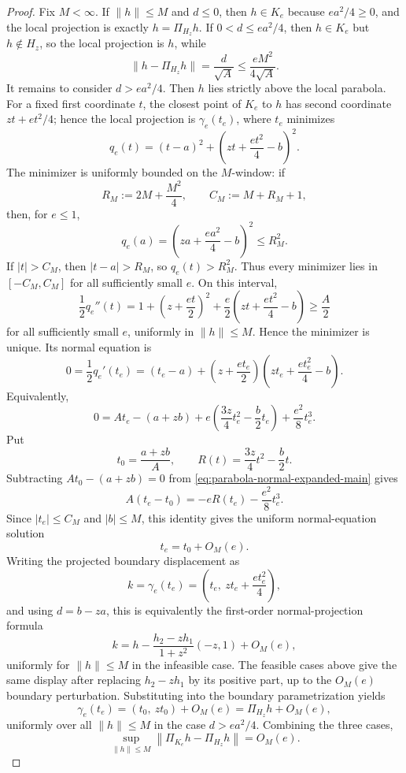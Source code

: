 \begin{proof}
Fix \(M<\infty\).  If \(\|h\|\le M\) and \(d\le0\), then \(h\in K_e\) because
\(e a^2/4\ge0\), and the local projection is exactly \(h=\Pi_{H_z}h\).  If
\(0<d\le e a^2/4\), then \(h\in K_e\) but \(h\notin H_z\), so the local
projection is \(h\), while
\[
\|h-\Pi_{H_z}h\|=\frac{d}{\sqrt A}\le \frac{eM^2}{4\sqrt A}.
\]
It remains to consider \(d>e a^2/4\).  Then \(h\) lies strictly above the
local parabola.  For a fixed first coordinate \(t\), the closest point of
\(K_e\) to \(h\) has second coordinate \(zt+et^2/4\); hence the local
projection is \(\gamma_e(t_e)\), where \(t_e\) minimizes
\[
q_e(t)=(t-a)^2+\left(zt+\frac{e t^2}{4}-b\right)^2 .
\]
The minimizer is uniformly bounded on the \(M\)-window: if
\[
R_M:=2M+\frac{M^2}{4},\qquad C_M:=M+R_M+1,
\]
then, for \(e\le1\),
\[
q_e(a)=\left(za+\frac{e a^2}{4}-b\right)^2\le R_M^2 .
\]
If \(|t|>C_M\), then \(|t-a|>R_M\), so \(q_e(t)>R_M^2\).  Thus every
minimizer lies in \([-C_M,C_M]\) for all sufficiently small \(e\).  On this
interval,
\[
\frac12q_e''(t)
=1+\left(z+\frac{et}{2}\right)^2
+\frac e2\left(zt+\frac{e t^2}{4}-b\right)
\ge \frac A2
\]
for all sufficiently small \(e\), uniformly in \(\|h\|\le M\).  Hence the
minimizer is unique.  Its normal equation is
\begin{equation}\label{eq:parabola-normal-equation-main}
0=\frac12q_e'(t_e)
=(t_e-a)+\left(z+\frac{e t_e}{2}\right)
\left(zt_e+\frac{e t_e^2}{4}-b\right).
\end{equation}
Equivalently,
\begin{equation}\label{eq:parabola-normal-expanded-main}
0=A t_e-(a+zb)
+e\left(\frac{3z}{4}t_e^2-\frac b2t_e\right)
+\frac{e^2}{8}t_e^3 .
\end{equation}
Put
\[
t_0=\frac{a+zb}{A},\qquad
R(t)=\frac{3z}{4}t^2-\frac b2t .
\]
Subtracting \(A t_0-(a+zb)=0\) from
\eqref{eq:parabola-normal-expanded-main} gives
\[
A(t_e-t_0)=-eR(t_e)-\frac{e^2}{8}t_e^3 .
\]
Since \(|t_e|\le C_M\) and \(|b|\le M\), this identity gives the uniform
normal-equation solution
\[
t_e=t_0+O_M(e).
\]
Writing the projected boundary displacement as
\[
k=\gamma_e(t_e)
=\left(t_e,\ zt_e+\frac{e t_e^2}{4}\right),
\]
and using \(d=b-za\), this is equivalently the first-order normal-projection
formula
\[
k
=h-\frac{h_2-zh_1}{1+z^2}(-z,1)+O_M(e),
\]
uniformly for \(\|h\|\le M\) in the infeasible case.  The feasible cases above
give the same display after replacing \(h_2-zh_1\) by its positive part, up to
the \(O_M(e)\) boundary perturbation.
Substituting into the boundary parametrization yields
\[
\gamma_e(t_e)
=\left(t_0,\ zt_0\right)+O_M(e)
=\Pi_{H_z}h+O_M(e),
\]
uniformly over all \(\|h\|\le M\) in the case \(d>ea^2/4\).  Combining the
three cases,
\begin{equation}\label{eq:scaled-local-hypograph-projection-main}
\sup_{\|h\|\le M}
\left\|\Pi_{K_e}h-\Pi_{H_z}h\right\|=O_M(e).
\end{equation}


\end{proof}
